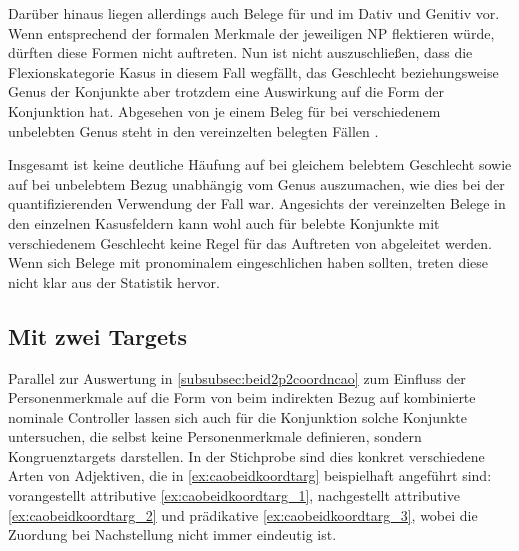 Darüber hinaus liegen allerdings auch Belege für  und 
im Dativ und Genitiv vor. Wenn  entsprechend der formalen
Merkmale der jeweiligen NP flektieren würde, dürften diese Formen nicht
auftreten. Nun ist nicht auszuschließen, dass die Flexionskategorie Kasus in
diesem Fall wegfällt, das Geschlecht beziehungsweise Genus der Konjunkte aber
trotzdem eine Auswirkung auf die Form der Konjunktion hat. Abgesehen von je
einem Beleg für  bei verschiedenem unbelebten Genus steht in den
vereinzelten belegten Fällen .

Insgesamt ist keine deutliche Häufung auf  bei gleichem belebtem
Geschlecht sowie auf  bei unbelebtem Bezug unabhängig vom Genus
auszumachen, wie dies bei der quantifizierenden Verwendung der Fall war.
Angesichts der vereinzelten Belege in den einzelnen Kasusfeldern kann wohl auch
für belebte Konjunkte mit verschiedenem Geschlecht keine Regel für das
Auftreten von  abgeleitet werden. Wenn sich Belege mit
pronominalem  eingeschlichen haben sollten, treten diese nicht klar
aus der Statistik hervor.

\subsection{Mit zwei Targets}
\label{subsec:caobeidkoordtarg}

Parallel zur Auswertung in \cref{subsubsec:beid2p2coordncao} zum Einfluss der
Personenmerkmale auf die Form von  beim indirekten Bezug auf
kombinierte nominale Controller lassen sich auch für die Konjunktion
 solche Konjunkte untersuchen, die selbst keine Personenmerkmale
definieren, sondern Kongruenz\-targets darstellen. In der Stichprobe sind dies
konkret verschiedene Arten von Adjektiven, die in \cref{ex:caobeidkoordtarg}
beispielhaft angeführt sind: vorangestellt attributive
\cref{ex:caobeidkoordtarg_1}, nachgestellt attributive
\cref{ex:caobeidkoordtarg_2} und prädikative \cref{ex:caobeidkoordtarg_3},
wobei die Zuordung bei Nachstellung nicht immer eindeutig ist.

